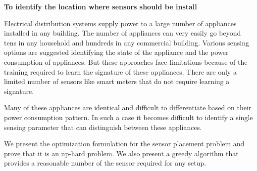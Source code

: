 \textbf{To identify the location where sensors should be install}

Electrical distribution systems supply power to a large number of appliances installed in any building. The number of appliances can very easily go beyond tens in any household and hundreds in any commercial building. Various sensing options are suggested identifying the state of the appliance and the power consumption of appliances. But these approaches face limitations because of the training required to learn the signature of these appliances. There are only a limited number of sensors like smart meters that do not require learning a signature. 

Many of these appliances are identical and difficult to differentiate based on their power consumption pattern. In such a case it becomes difficult to identify a single sensing parameter that can distinguish between these appliances. 

We present the optimization formulation for the sensor placement problem and prove that it is an np-hard problem. We also present a greedy algorithm that provides a reasonable number of the sensor required for any setup. 
   

